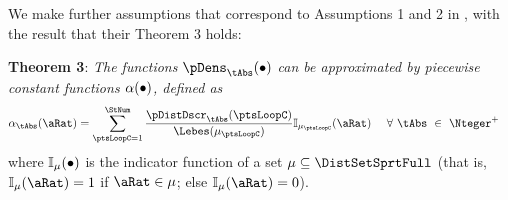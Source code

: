 \documentclass[../BufferStockTheory.tex]{subfiles}\usepackage{ApndxSteadyState}
\begin{document}
  We make further assumptions that correspond to Assumptions 1 and 2 in \cite{saDiscretize}, with the result that their Theorem 3 holds:
  \begin{comment} %
  \textbf{Assumption \ref{assn:Bounded}} For given sets $\TrnsSetSprtTrnc \subset \DistSetSprtFull^{2}$ and $\DistSetSprtTrnc_{0} \subset \DistSetSprtFull$, there exist positive constants $\epsilon$ and $\epsilon_{0}$, such that $\trns_{\point}(\Nxt{\point}|\point) $ and $\pDens_{0}(\point)$ satisfy the following conditions:

  \begin{equation}\begin{gathered}\begin{aligned}
    \trns_{\point}(\Nxt{\point}|\point) \leq \epsilon ~~~~\forall(\point,\Nxt{\point})~\in~\DistSetSprtFull \backslash \TrnsSetSprtTrnc, \text{~and~} \pDens_{0}(\point) \leq \epsilon_{0}
  \end{aligned}\end{gathered}\end{equation}

  \textbf{Assumption \ref{assn:Lipschitz}} see \cite{eaDiscretize} Assumption 2.
\end{comment}

  \textbf{Theorem 3}: \textit{The functions $\pDens_{\tAbs}(\bullet)$ can  be approximated by piecewise constant functions $\alpha(\bullet)$, defined as}
  \begin{equation}\begin{gathered}\begin{aligned}\label{eq:PrbBinNxtFmPntNow}
    \pContAprx_{\tAbs}(\point) &= \sum_{\ptsLoopC=1}^{\StNum} \frac{\pDistDscr_{\tAbs}(\ptsLoopC)}{\Lebes(\SetSub_{\ptsLoopC})} \mathbb{I}_{\SetSub_{\ptsLoopC}}(\point)~~~~\forall~\tAbs~\in~\Nteger^{+}
  \end{aligned}\end{gathered}\end{equation}where $\mathbb{I}_{\mu}(\bullet)$ is the indicator function of a set $\SetSub \subseteq \DistSetSprtFull$ (that is, $\mathbb{I}_{\SetSub}(\point) = 1$ if $\point \in \SetSub$; else $\mathbb{I}_{\SetSub}(\point) = 0$).  %
\end{document}
